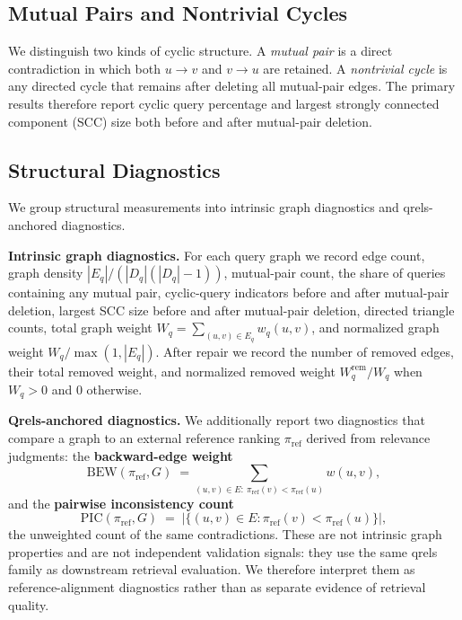 \documentclass[manuscript,anonymous,review]{acmart}
\begin{document}
\subsection{Mutual Pairs and Nontrivial Cycles}

We distinguish two kinds of cyclic structure. A \emph{mutual pair} is a direct
contradiction in which both $u \rightarrow v$ and $v \rightarrow u$ are
retained. A \emph{nontrivial cycle} is any directed cycle that remains after
deleting all mutual-pair edges. The primary results therefore report cyclic
query percentage and largest strongly connected component (SCC) size both
before and after mutual-pair deletion.

\subsection{Structural Diagnostics}
\label{sec:structural-metrics}

We group structural measurements into intrinsic graph diagnostics and
qrels-anchored diagnostics.

\textbf{Intrinsic graph diagnostics.} For each query graph we record edge
count, graph density $|E_q|/(|D_q|(|D_q|-1))$, mutual-pair count, the share of
queries containing any mutual pair, cyclic-query indicators before and after
mutual-pair deletion, largest SCC size before and after mutual-pair deletion,
directed triangle counts, total graph weight
$W_q=\sum_{(u,v)\in E_q} w_q(u,v)$, and normalized graph weight
$W_q/\max(1,|E_q|)$. After repair we record the number of removed edges,
their total removed weight, and normalized removed weight
$W_q^{\mathrm{rem}}/W_q$ when $W_q>0$ and $0$ otherwise.

\textbf{Qrels-anchored diagnostics.} We additionally report two diagnostics
that compare a graph to an external reference ranking $\pi_{\mathrm{ref}}$
derived from relevance judgments: the \textbf{backward-edge weight}
\begin{equation}
  \mathrm{BEW}(\pi_{\mathrm{ref}}, G) \;=\!\! \sum_{(u,v)\in E:\ \pi_{\mathrm{ref}}(v) < \pi_{\mathrm{ref}}(u)} \!\! w(u,v),
  \label{eq:bew}
\end{equation}
and the \textbf{pairwise inconsistency count}
\begin{equation}
  \mathrm{PIC}(\pi_{\mathrm{ref}}, G) \;=\; \bigl|\{(u,v)\in E : \pi_{\mathrm{ref}}(v) < \pi_{\mathrm{ref}}(u)\}\bigr|,
  \label{eq:pic}
\end{equation}
the unweighted count of the same contradictions. These are not intrinsic graph
properties and are not independent validation signals: they use the same qrels
family as downstream retrieval evaluation. We therefore interpret them as
reference-alignment diagnostics rather than as separate evidence of retrieval
quality.
\end{document}
